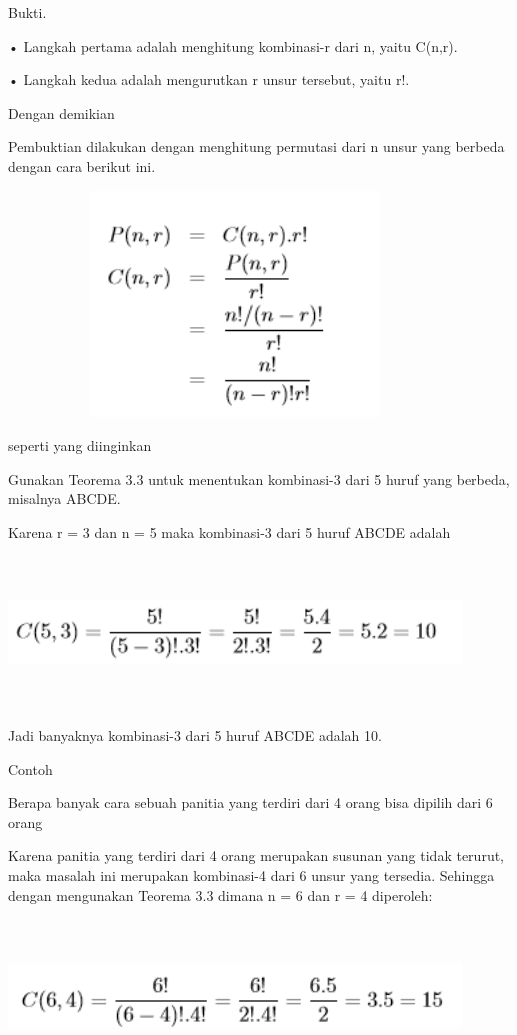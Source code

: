\documentclass[11pt,fleqn]{book} %
\begin{document}
Bukti.

• Langkah pertama adalah menghitung kombinasi-r dari n, yaitu C(n,r). 


• Langkah kedua adalah mengurutkan r unsur tersebut, yaitu r!.

 Dengan demikian
 
 
Pembuktian dilakukan dengan menghitung permutasi dari n unsur yang berbeda dengan cara berikut ini.

\includegraphics[width = 12cm, height= 6cm]{Pictures/herlin7.png}

seperti yang diinginkan

Gunakan Teorema 3.3 untuk menentukan kombinasi-3 dari 5 huruf yang berbeda, misalnya ABCDE.


Karena r = 3 dan n = 5 maka kombinasi-3 dari 5 huruf ABCDE adalah

\includegraphics[width = 12cm, height= 4cm]{Pictures/herlin8.png}


Jadi banyaknya kombinasi-3 dari 5 huruf ABCDE adalah 10.


Contoh

Berapa banyak cara sebuah panitia yang terdiri dari 4 orang bisa dipilih dari 6 orang


Karena panitia yang terdiri dari 4 orang merupakan susunan yang tidak terurut, maka masalah ini merupakan kombinasi-4 dari 6 unsur yang tersedia. Sehingga dengan mengunakan Teorema 3.3 dimana n = 6 dan r = 4 diperoleh: 


\includegraphics[width = 12cm, height= 4cm]{Pictures/herlin9.png}
\end{document}

